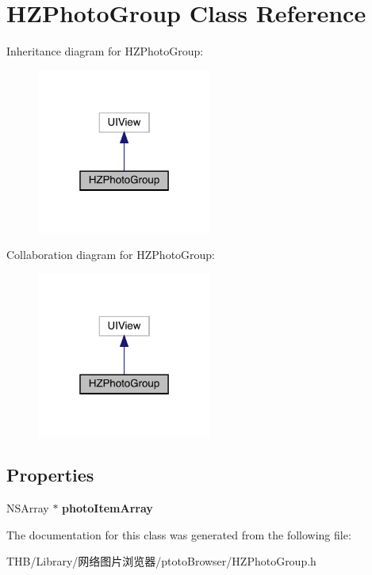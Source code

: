 \hypertarget{interface_h_z_photo_group}{}\section{H\+Z\+Photo\+Group Class Reference}
\label{interface_h_z_photo_group}


Inheritance diagram for H\+Z\+Photo\+Group\+:\nopagebreak
\begin{figure}[H]
\begin{center}
\leavevmode
\includegraphics[width=163pt]{interface_h_z_photo_group__inherit__graph}
\end{center}
\end{figure}


Collaboration diagram for H\+Z\+Photo\+Group\+:\nopagebreak
\begin{figure}[H]
\begin{center}
\leavevmode
\includegraphics[width=163pt]{interface_h_z_photo_group__coll__graph}
\end{center}
\end{figure}
\subsection*{Properties}
\begin{DoxyCompactItemize}
\item 
\mbox{\label{interface_h_z_photo_group_afb3cfea012c06d1a97e70042f56eea69}} 
N\+S\+Array $\ast$ {\bfseries photo\+Item\+Array}
\end{DoxyCompactItemize}


The documentation for this class was generated from the following file\+:\begin{DoxyCompactItemize}
\item 
T\+H\+B/\+Library/网络图片浏览器/ptoto\+Browser/H\+Z\+Photo\+Group.\+h\end{DoxyCompactItemize}
